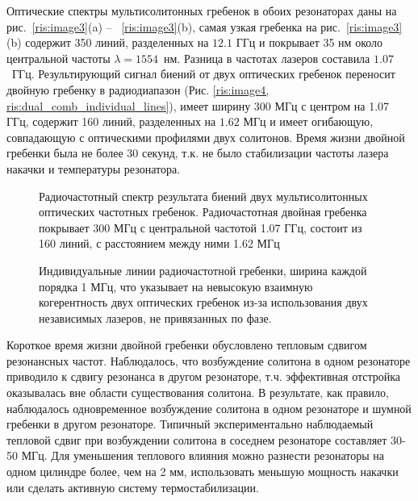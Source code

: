 Оптические спектры мультисолитонных гребенок в обоих резонаторах даны на рис.~\ref{ris:image3}(a) -- ~\ref{ris:image3}(b), самая узкая гребенка на рис.~\ref{ris:image3}(b) содержит 350 линий, разделенных на $12.1$ ГГц и покрывает 35 нм около центральной частоты $\lambda = 1554$~нм. Разница в частотах лазеров составила $1.07$~ГГц. Результирующий сигнал биений от двух оптических гребенок переносит двойную гребенку в радиодиапазон (Рис. \ref{ris:image4, ris:dual_comb_individual_lines}), имеет ширину 300 МГц с центром на 1.07 ГГц, содержит 160 линий, разделенных на $1.62$ МГц и имеет огибающую, совпадающую с оптическими профилями двух солитонов. Время жизни двойной гребенки была не более 30 секунд, т.к. не было стабилизации частоты лазера накачки и температуры резонатора.

\begin{figure}[ht]
\begin{minipage}[ht]{1\linewidth}
\end{minipage}
\caption{Радиочастотный спектр результата биений двух мультисолитонных оптических частотных гребенок. Радиочастотная двойная гребенка покрывает 300 МГц с центральной частотой 1.07 ГГц, состоит из 160 линий, с расстоянием между ними 1.62 МГц}
\label{ris:image4}
\end{figure}

\begin{figure}[ht]
\begin{minipage}[ht]{1\linewidth}
\end{minipage}
\caption{Индивидуальные линии радиочастотной гребенки, ширина каждой порядка 1 МГц, что указывает на невысокую взаимную когерентность двух оптических гребенок из-за использования двух независимых лазеров, не привязанных по фазе.}
\label{ris:dual_comb_individual_lines}
\end{figure}



Короткое время жизни двойной гребенки обусловлено тепловым сдвигом резонансных частот. Наблюдалось, что возбуждение солитона в одном резонаторе приводило к сдвигу резонанса в другом резонаторе, т.ч. эффективная отстройка оказывалась вне области существования солитона. В результате, как правило, наблюдалось одновременное возбуждение солитона в одном резонаторе и шумной гребенки в другом резонаторе. Типичный экспериментально наблюдаемый тепловой сдвиг при возбуждении солитона в соседнем резонаторе составляет 30-50 МГц. Для уменьшения теплового влияния можно разнести резонаторы на одном цилиндре более, чем на 2 мм, использовать меньшую мощность накачки или сделать активную систему термостабилизации.

